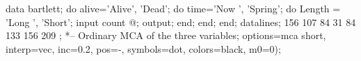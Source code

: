 \begin{listing}
data bartlett;
   do alive='Alive', 'Dead';
      do time='Now   ', 'Spring';
         do Length = 'Long ', 'Short';
            input count @;
            output;
            end;
         end;
      end;
datalines;
 156 107  84  31
  84 133 156 209
;
*-- Ordinary MCA of the three variables;
   options=mca short, interp=vec, inc=0.2, pos=-,
   symbols=dot, colors=black, m0=0);
\end{listing}
